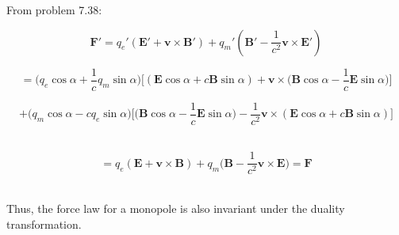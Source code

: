 \documentclass[14pt]{extarticle}
\renewcommand{\v}[1]{{\bm #1}}
\begin{document}
From problem 7.38:

$$\v F' = q_e'(\v E' + \v v \times \v B') + q_m'(\v B' - \frac{1}{c^2} \v v \times \v E')$$

$$= \bigg(q_e\cos\alpha + \frac 1c q_m  \sin\alpha \bigg) \bigg[ (\v E \cos\alpha + c\v B \sin\alpha) + \v v \times \bigg( \v B\cos\alpha - \frac 1c \v E\sin\alpha \bigg) \bigg]$$

$$+ \bigg( q_m \cos\alpha - cq_e \sin\alpha \bigg) \bigg[ \bigg( \v B \cos\alpha - \frac 1c \v  E\sin\alpha \bigg) - \frac{1}{c^2} \v v \times (\v E\cos\alpha + c \v B\sin\alpha)  \bigg]$$ \ 

$$= q_e (\v E + \v v \times \v B) + q_m \bigg( \v B - \frac{1}{c^2} \v v \times \v E \bigg) = \v F$$ \ 

Thus, the force law for a monopole is also invariant under the duality transformation. 
\end{document}

